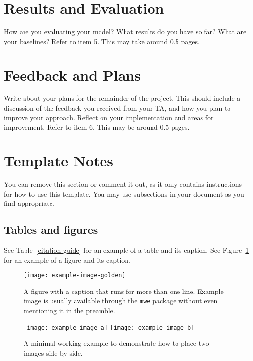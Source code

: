 \documentclass[11pt]{article}
\begin{document}
\section{Results and Evaluation}

How are you evaluating your model? What results do you have so far? What are your baselines? Refer to item 5. This may take around 0.5 pages.

\section{Feedback and Plans}

Write about your plans for the remainder of the project. This should include a discussion of the feedback you received from your TA, and how you plan to improve your approach. Reflect on your implementation and areas for improvement. Refer to item 6. This may be around 0.5 pages.

\section{Template Notes}

You can remove this section or comment it out, as it only contains instructions for how to use this template. You may use subsections in your document as you find appropriate.

\subsection{Tables and figures}

See Table~\ref{citation-guide} for an example of a table and its caption.
See Figure~\ref{fig:experiments} for an example of a figure and its caption.


\begin{figure}[t]
  \texttt{[image: example-image-golden]}
  \caption{A figure with a caption that runs for more than one line.
    Example image is usually available through the \texttt{mwe} package
    without even mentioning it in the preamble.}
  \label{fig:experiments}
\end{figure}

\begin{figure*}[t]
  \texttt{[image: example-image-a]} \hfill
  \texttt{[image: example-image-b]}
  \caption {A minimal working example to demonstrate how to place
    two images side-by-side.}
\end{figure*}
\end{document}
